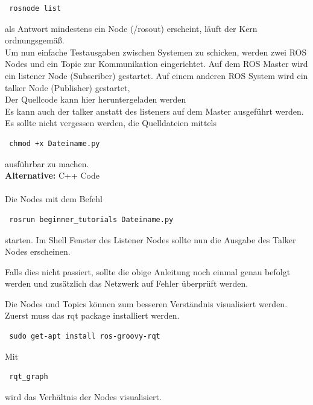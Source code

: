 \documentclass[12pt]{article}
\begin{document}
 \begin{lstlisting}
 rosnode list
 \end{lstlisting}

als Antwort mindestens ein Node (/rosout) erscheint, läuft der Kern ordnungsgemäß. \\
Um nun einfache Testausgaben zwischen Systemen zu schicken, werden zwei ROS Nodes und ein Topic zur Kommunikation eingerichtet.
Auf dem ROS Master wird ein listener Node (Subscriber) gestartet.
Auf einem anderen ROS System wird ein talker Node (Publisher) gestartet, \\ Der Quellcode kann hier heruntergeladen werden \cite{PythonCode}  \\
Es kann auch der talker anstatt des listeners auf dem Master ausgeführt werden.
Es sollte nicht vergessen werden, die Quelldateien mittels

 \begin{lstlisting}
 chmod +x Dateiname.py
 \end{lstlisting}

ausführbar zu machen. \\
{\bf Alternative:} C++ Code \cite{C++Code} \\
\\
Die Nodes mit dem Befehl 

 \begin{lstlisting}
 rosrun beginner_tutorials Dateiname.py
 \end{lstlisting}
 
starten.
Im Shell Fenster des Listener Nodes sollte nun die Ausgabe des Talker Nodes erscheinen.

Falls dies nicht passiert, sollte die obige Anleitung noch einmal genau befolgt werden und zusätzlich das Netzwerk auf Fehler überprüft werden.
\cite{NetworkSetup}

Die Nodes und Topics können zum besseren Verständnis visualisiert werden.
Zuerst muss das rqt package installiert werden.

 \begin{lstlisting}
 sudo get-apt install ros-groovy-rqt
 \end{lstlisting}

Mit 

 \begin{lstlisting}
 rqt_graph 
 \end{lstlisting}

wird das Verhältnis der Nodes visualisiert.
\end{document}
